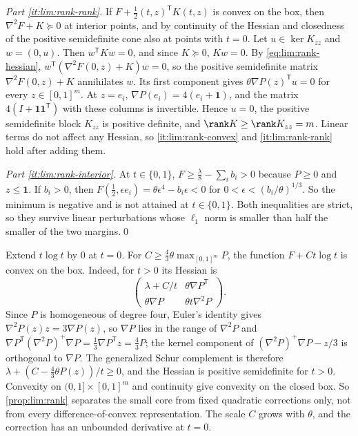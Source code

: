 \emph{Part \ref{it:lim:rank-rank}.} If $F+\frac12(t,z)^{\mathsf T}K(t,z)$ is
convex on the box, then $\nabla^2F+K\succeq0$ at interior points, and by
continuity of the Hessian and closedness of the positive semidefinite cone
also at points with $t=0$. Let $u\in\ker K_{zz}$ and $w=(0,u)$. Then
$w^{\mathsf T}Kw=0$, and since $K\succeq0$, $Kw=0$. By
\eqref{eq:lim:rank-hessian}, $w^{\mathsf T}(\nabla^2F(0,z)+K)w=0$, so the
positive semidefinite matrix $\nabla^2F(0,z)+K$ annihilates $w$. Its first
component gives $\theta\nabla P(z)^{\mathsf T}u=0$ for every
$z\in[0,1]^m$. At $z=e_i$, $\nabla P(e_i)=4(e_i+\mathbf1)$, and the matrix
$4(I+\mathbf1\mathbf1^{\mathsf T})$ with these columns is invertible. Hence
$u=0$, the positive semidefinite block $K_{zz}$ is positive definite, and
$\rank K\ge\rank K_{zz}=m$. Linear terms do not affect any Hessian, so
\ref{it:lim:rank-convex} and \ref{it:lim:rank-rank} hold after adding them.

\emph{Part \ref{it:lim:rank-interior}.} At $t\in\{0,1\}$,
$F\ge\frac\lambda8-\sum_ib_i>0$ because $P\ge0$ and $z\le\mathbf1$. If
$b_i>0$, then $F(\frac12,\epsilon e_i)=\theta\epsilon^4-b_i\epsilon<0$ for
$0<\epsilon<(b_i/\theta)^{1/3}$. So the minimum is negative and is not
attained at $t\in\{0,1\}$. Both inequalities are strict, so they survive
linear perturbations whose $\ell_1$ norm is smaller than half the smaller
of the two margins.\qed

\begin{remark}\label{rem:lim:entropy}
Extend $t\log t$ by $0$ at $t=0$. For $C\ge\frac43\theta\max_{[0,1]^m}P$, the
function $F+Ct\log t$ is convex on the box. Indeed, for $t>0$ its Hessian is
\[
 \begin{pmatrix}\lambda+C/t&\theta\nabla P^{\mathsf T}\\
 \theta\nabla P&\theta t\nabla^2P\end{pmatrix}.
\]
Since $P$ is homogeneous of degree four, Euler's identity gives
$\nabla^2P(z)z=3\nabla P(z)$, so $\nabla P$ lies in the range of $\nabla^2P$
and $\nabla P^{\mathsf T}(\nabla^2P)^{+}\nabla P=\frac13\nabla P^{\mathsf T}z
=\frac43P$; the kernel component of $(\nabla^2P)^+\nabla P-z/3$ is
orthogonal to $\nabla P$. The generalized Schur complement is therefore
$\lambda+(C-\frac43\theta P(z))/t\ge0$, and the Hessian is positive
semidefinite for $t>0$. Convexity on $(0,1]\times[0,1]^m$ and continuity
give convexity on the closed box. So
\cref{prop:lim:rank} separates the small core from fixed quadratic
corrections only, not from every difference-of-convex representation. The
scale $C$ grows with $\theta$, and the correction has an unbounded
derivative at $t=0$.
\end{remark}
